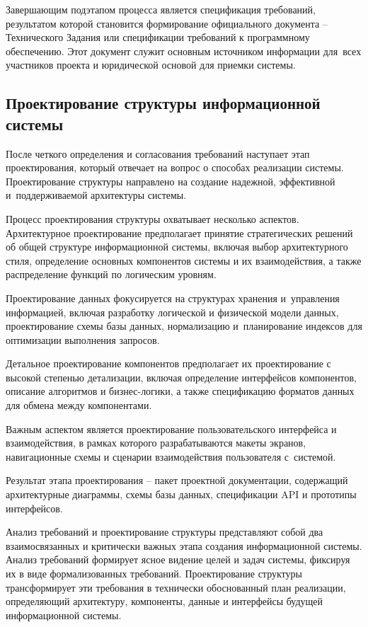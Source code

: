 \documentclass{ou}
\begin{document}
Завершающим подэтапом процесса является спецификация требований, результатом которой становится формирование официального документа -- Технического Задания или спецификации требований к программному обеспечению. Этот документ служит основным источником информации для~всех участников проекта и юридической основой для приемки системы.
\subsection{Проектирование структуры информационной системы}
После четкого определения и согласования требований наступает этап проектирования, который отвечает на вопрос о способах реализации системы. Проектирование структуры направлено на создание надежной, эффективной и~поддерживаемой архитектуры системы.

Процесс проектирования структуры охватывает несколько аспектов. Архитектурное проектирование предполагает принятие стратегических решений об общей структуре информационной системы, включая выбор архитектурного стиля, определение основных компонентов системы и их взаимодействия, а также распределение функций по логическим уровням.

Проектирование данных фокусируется на структурах хранения и~управления информацией, включая разработку логической и физической модели данных, проектирование схемы базы данных, нормализацию и~планирование индексов для оптимизации выполнения запросов.

Детальное проектирование компонентов предполагает их проектирование с высокой степенью детализации, включая определение интерфейсов компонентов, описание алгоритмов и бизнес-логики, а также спецификацию форматов данных для обмена между компонентами.

Важным аспектом является проектирование пользовательского интерфейса и взаимодействия, в рамках которого разрабатываются макеты экранов, навигационные схемы и сценарии взаимодействия пользователя с~системой.

Результат этапа проектирования -- пакет проектной документации, содержащий архитектурные диаграммы, схемы базы данных, спецификации API и прототипы интерфейсов.

Анализ требований и проектирование структуры представляют собой два взаимосвязанных и критически важных этапа создания информационной системы. Анализ требований формирует ясное видение целей и задач системы, фиксируя их в виде формализованных требований. Проектирование структуры трансформирует эти требования в технически обоснованный план реализации, определяющий архитектуру, компоненты, данные и интерфейсы будущей информационной системы.
\newpage
\end{document}
